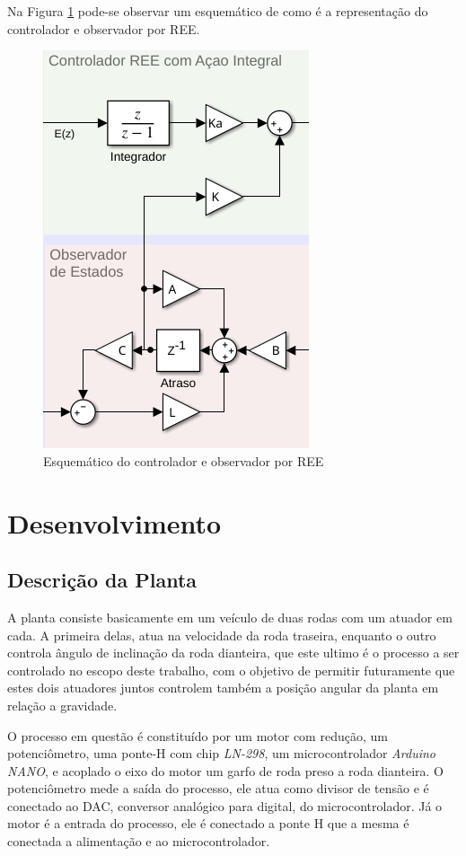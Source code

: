 \documentclass[conference,harvard,brazil,english]{sbatex}
\begin{document}
            Na Figura \ref{ss_corte} pode-se observar um esquemático de como é a representação do controlador e observador por REE.
            
            \begin{figure}[!htb] 
            \centering
                \includegraphics[width=0.5\columnwidth]{imagens/esquemaREE.png}{
                \small
                \centering
                \caption{Esquemático do controlador e observador por REE}
                \label{ss_corte}}
            \end{figure}
            
        
    \section{Desenvolvimento}
    
        \subsection{Descrição da Planta}
        
            A planta consiste basicamente em um veículo de duas rodas com um atuador em cada. A primeira delas, atua na velocidade da roda traseira, enquanto o outro controla ângulo de inclinação da roda dianteira, que este ultimo é o processo a ser controlado no escopo deste trabalho, com o objetivo de permitir futuramente que estes dois atuadores juntos controlem também a posição angular da planta em relação a gravidade.
            
            O processo em questão é constituído por um motor com redução, um potenciômetro, uma ponte-H com chip \textit{LN-298}, um microcontrolador \textit{Arduino NANO}, e acoplado o eixo do motor um garfo de roda preso a roda dianteira. O potenciômetro mede a saída do processo, ele atua como divisor de tensão e é conectado ao DAC, conversor analógico para digital, do microcontrolador. Já o motor é a entrada do processo, ele é conectado a ponte H que a mesma é conectada a alimentação e ao microcontrolador.
            
\end{document}
